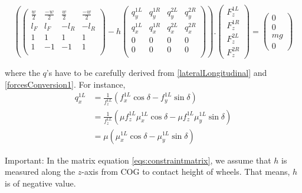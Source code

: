 \documentclass[paper=a4, fontsize=11pt]{scrartcl} %
\numberwithin{equation}{section} %
\numberwithin{figure}{section} %
\numberwithin{table}{section} %
\begin{document}
\begin{equation}\label{eqs:constraintmatrix}
\left(
\left(
\begin{matrix}
\frac{w}{2} & \frac{-w}{2} & \frac{w}{2} & \frac{-w}{2} \\
l_F & l_F & -l_R & -l_R \\
1 & 1 & 1 & 1 \\
1 &-1 &-1 & 1 \\
\end{matrix}
\right)
-
h 
\left(
\begin{matrix}
q_y^{1L} & q_y^{1R} & q_y^{2L} & q_y^{2R} \\
q_x^{1L} & q_x^{1R} & q_x^{2L} & q_x^{2R} \\
0 & 0 & 0 & 0 \\
0 & 0 & 0 & 0 \\
\end{matrix}
\right)
\right)
.
\left(
\begin{matrix}
F_z^{1L} \\
F_z^{1R} \\
F_z^{2L} \\
F_z^{2R}
\end{matrix}
\right)
=
\left(
\begin{matrix}
0 \\
0 \\
m g \\
0
\end{matrix}
\right)
\end{equation}

where the $q$'s have to be carefully derived from \eqref{lateralLongitudinal} and
\eqref{forcesConversion1}.
For instance, 
\begin{align*}
q_x^{1L} &=\frac{1}{f_z^{1L}}(f_x^{1L}\cos \delta-f_y^{1L}\sin \delta) \\
         &=\frac{1}{f_z^{1L}}(\mu f_z^{1L}\mu_x^{1L} \cos \delta-\mu f_z^{1L}\mu_y^{1L}\sin \delta) \\
         &=\mu(\mu_x^{1L} \cos \delta-\mu_y^{1L}\sin \delta)
\end{align*}

Important:
In the matrix equation \eqref{eqs:constraintmatrix}, we assume that $h$ is measured along the $z$-axis from COG to contact height of wheels. That means, $h$ is of negative value.

\end{document}
